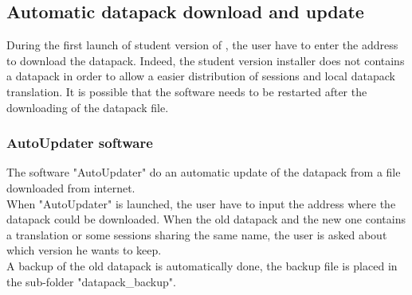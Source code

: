 \subsection{Automatic datapack download and update}
During the first launch of student version of \tria, the user have to enter the address to download the datapack. Indeed, the student version installer does not contains a datapack in order to allow a easier distribution of sessions and local datapack translation. It is possible that the software needs to be restarted after the downloading of the datapack file.\\


\subsubsection{AutoUpdater software}
The software "AutoUpdater" do an automatic update of the datapack from a file downloaded from internet.\\

When "AutoUpdater" is launched, the user have to input the address where the datapack could be downloaded. When the old datapack and the new one contains a translation or some sessions sharing the same name, the user is asked about which version he wants to keep.\\

A backup of the old datapack is automatically done, the backup file is placed in the sub-folder "datapack\_backup".\\


